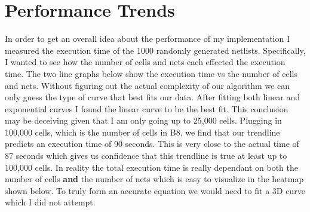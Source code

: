 \documentclass[10pt]{article}
\begin{document}
\newpage
\section{Performance Trends}

In order to get an overall idea about the performance of my implementation I
measured the execution time of the 1000 randomly generated netlists.
Specifically, I wanted to see how the number of cells and nets each effected
the execution time.  The two line graphs below show the execution time vs the
number of cells and nets. Without figuring out the actual complexity of our
algorithm we can only guess the type of curve that best fits our data. After
fitting both linear and exponential curves I found the linear curve to be the
best fit. This conclusion may be deceiving given that I am only going up to 25,000
cells. Plugging in 100,000 cells, which is the number of cells in B8, we find
that our trendline predicts an execution time of 90 seconds. This is very close
to the actual time of 87 seconds which gives us confidence that this trendline
is true at least up to 100,000 cells.  In reality the total execution time is
really dependant on both the number of cells \textbf{and} the number of nets
which is easy to visualize in the heatmap shown below. To truly form an
accurate equation we would need to fit a 3D curve which I did not attempt.
\end{document}
